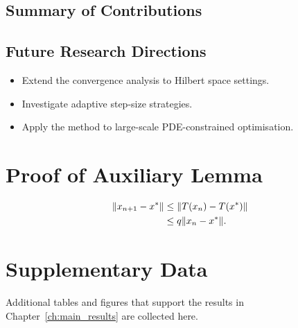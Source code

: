 \documentclass[12pt, a4paper, oneside]{book}
\theoremstyle{plain}
\theoremstyle{definition}
\begin{document}
% 

\section{Summary of Contributions}
\lipsum[10]

\section{Future Research Directions}
\begin{itemize}
    \item Extend the convergence analysis to Hilbert space settings.
    \item Investigate adaptive step-size strategies.
    \item Apply the method to large-scale PDE-constrained optimisation.
\end{itemize}

\appendix      %

\chapter{Proof of Auxiliary Lemma}
\label{app:aux_proof}

% 

\lipsum[11]

\begin{align}
    \lVert x_{n+1} - x^{*} \rVert
        &\leq \lVert T(x_n) - T(x^{*}) \rVert \notag \\
        &\leq q \lVert x_n - x^{*} \rVert.
\end{align}

\chapter{Supplementary Data}
\label{app:data}

% 

Additional tables and figures that support the results in
Chapter~\ref{ch:main_results} are collected here.
\end{document}
